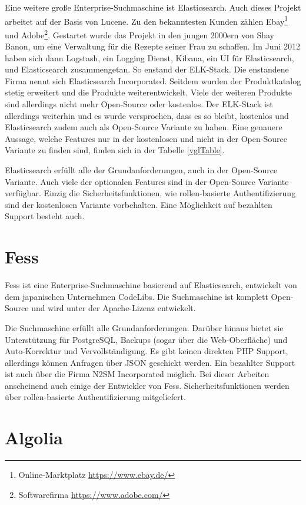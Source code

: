Eine weitere große Enterprise-Suchmaschine ist Elasticsearch. Auch dieses Projekt arbeitet auf der Basis von Lucene. Zu den bekanntesten Kunden zählen Ebay\footnote{Online-Marktplatz \url{https://www.ebay.de/}} und Adobe\footnote{Softwarefirma \url{https://www.adobe.com/}}. Gestartet wurde das Projekt in den jungen 2000ern von Shay Banon, um eine Verwaltung für die Rezepte seiner Frau zu schaffen. Im Juni 2012 haben sich dann Logstash, ein Logging Dienst, Kibana, ein UI für Elasticsearch, und Elasticsearch zusammengetan. So enstand der ELK-Stack. Die enstandene Firma nennt sich Elasticsearch Incorporated. Seitdem wurden der Produktkatalog stetig erweitert und die Produkte weiterentwickelt. Viele der weiteren Produkte sind allerdings nicht mehr Open-Source oder kostenlos. Der ELK-Stack ist allerdings weiterhin und es wurde versprochen, dass es so bleibt, kostenlos und Elasticsearch zudem auch als Open-Source Variante zu haben. Eine genauere Aussage, welche Features nur in der kostenlosen und nicht in der Open-Source Variante zu finden sind, finden sich in der Tabelle \ref{vglTable}.

Elasticsearch erfüllt alle der Grundanforderungen, auch in der Open-Source Variante. Auch viele der optionalen Features sind in der Open-Source Variante verfügbar. Einzig die Sicherheitsfunktionen, wie rollen-basierte Authentifizierung sind der kostenlosen Variante vorbehalten. Eine Möglichkeit auf bezahlten Support besteht auch. \cite{Elasticsearch.2019}

\section{Fess}
\label{fess}

Fess ist eine Enterprise-Suchmaschine basierend auf Elasticsearch, entwickelt von dem japanischen Unternehmen CodeLibs. Die Suchmaschine ist komplett Open-Source und wird unter der Apache-Lizenz entwickelt.

Die Suchmaschine erfüllt alle Grundanforderungen. Darüber hinaus bietet sie Unterstützung für PostgreSQL, Backups (sogar über die Web-Oberfläche) und Auto-Korrektur und Vervollständigung. Es gibt keinen direkten PHP Support, allerdings können Anfragen über JSON geschickt werden. Ein bezahlter Support ist auch über die Firma N2SM Incorporated \cite{N2SM.2019} möglich. Bei dieser Arbeiten anscheinend auch einige der Entwickler von Fess. Sicherheitsfunktionen werden über rollen-basierte Authentifizierung mitgeliefert. \cite{CodeLibs.2019}

\section{Algolia}
\label{algolia}

